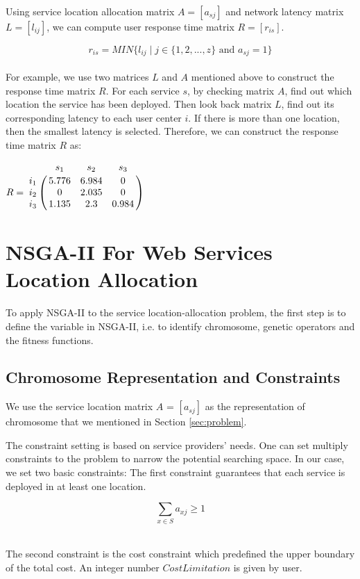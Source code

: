 \documentclass{llncs}
\let\bbordermatrix\bordermatrix
\begin{document}
Using service location allocation matrix $A = [a_{sj}]$ and network latency matrix $L = [l_{ij}]$, we can compute user
response time matrix $R = [r_{is}]$. 

{\centering
	\begin{equation}
		r_{is} = MIN\{l_{ij} \mid j \in \{1, 2, ..., z\} \text{ and } a_{sj} = 1\}
	\end{equation}
\\}
For example, we use two matrices $L$ and $A$ mentioned above to construct the response time matrix $R$. 
For each service $s$, by checking matrix $A$, find out which location the service has been deployed.
Then look back matrix $L$, find out its corresponding latency to each user center $i$. If there is
more than one location, then the smallest latency is selected. Therefore, we can construct the response time matrix $R$ as:

{\centering
$
R = \bbordermatrix{~ & s_{1} & s_{2} & s_{3}\cr
					i_{1}	&5.776 &6.984 &0	\cr
					i_{2}	&0  &2.035 &0	\cr
					i_{3}	&1.135 &2.3 &0.984	\cr}
$
\\}


\section{NSGA-II For Web Services Location Allocation}
\label{sec:algorithm_des}
To apply NSGA-II to the service location-allocation problem, the first step is to define the variable in NSGA-II, i.e. to
identify chromosome, genetic operators and the fitness functions.

\subsection{Chromosome Representation and Constraints}
We use the service location matrix $A$ = $[a_{sj}]$ as the representation of chromosome that we mentioned in Section 
\ref{sec:problem}.

The constraint setting is based on service providers' needs. One can set multiply constraints to the problem to narrow the potential searching space.
In our case, we set two basic constraints: The first constraint guarantees that each service is deployed in at 
least one location.

{\centering
	\begin{equation}
		\sum\limits_{x \in S} a_{xj} \geq 1
	\end{equation}
\\}

The second constraint is the cost constraint which predefined the upper boundary of the total cost.
An integer number $CostLimitation$ is given by user.
\end{document}

